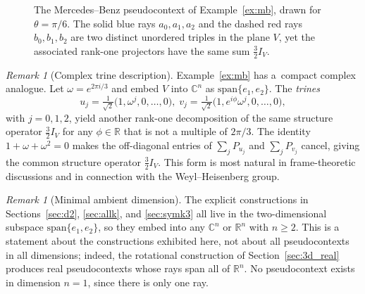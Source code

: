 \documentclass[
  twocolumn,
  aps,
  pra,
  floatfix,
  amsmath,amssymb,
  longbibliography
]{revtex4-2}
\theoremstyle{definition}
\theoremstyle{remark}
\newtheorem{remark}[theorem]{Remark}
\begin{document}
\begin{figure}[ht]
\centering
{}
\caption{The Mercedes--Benz pseudocontext of Example~\ref{ex:mb},
drawn for $\theta=\pi/6$.  The solid blue rays $a_0,a_1,a_2$ and the
dashed red rays $b_0,b_1,b_2$ are two distinct unordered triples in
the plane $V$, yet the associated rank-one projectors have the same
sum $\tfrac{3}{2}I_V$.}
\label{fig:mb}
\end{figure}

\begin{remark}[Complex trine description]\label{rem:trine}
Example~\ref{ex:mb} has a~compact complex analogue.  Let
$\omega=e^{2\pi i/3}$ and embed $V$ into $\mathbb{C}^n$ as
$\mathrm{span}\{e_1,e_2\}$.  The \emph{trines}
\[
  u_j=\tfrac{1}{\sqrt{2}}\bigl(1,\omega^j,0,\ldots,0\bigr),\;
  v_j=\tfrac{1}{\sqrt{2}}\bigl(1,e^{i\phi}\omega^j,0,\ldots,0\bigr),
\]
with $j=0,1,2$, yield another rank-one decomposition of the same
structure operator $\tfrac{3}{2}I_V$ for any $\phi\in\mathbb{R}$
that is not a multiple of $2\pi/3$.  The identity
$1+\omega+\omega^2=0$ makes the off-diagonal entries of
$\sum_j P_{u_j}$ and $\sum_j P_{v_j}$ cancel, giving the common
structure operator $\frac{3}{2}I_V$.  This form is most natural in
frame-theoretic discussions and in connection with the
Weyl--Heisenberg group.
\end{remark}

\begin{remark}[Minimal ambient dimension]\label{rem:minimaldim}
The explicit constructions in Sections~\ref{sec:d2}, \ref{sec:allk}, and
\ref{sec:symk3} all live in the two-dimensional subspace
$\mathrm{span}\{e_1,e_2\}$, so they embed into any $\mathbb{C}^n$ or
$\mathbb{R}^n$ with $n\ge 2$. This is a statement about the constructions
exhibited here, not about all pseudocontexts in all dimensions; indeed,
the rotational construction of Section~\ref{sec:3d_real} produces real
pseudocontexts whose rays span all of $\mathbb{R}^n$. No
pseudocontext exists in dimension $n=1$, since there is only one ray.
\end{remark}
\end{document}
